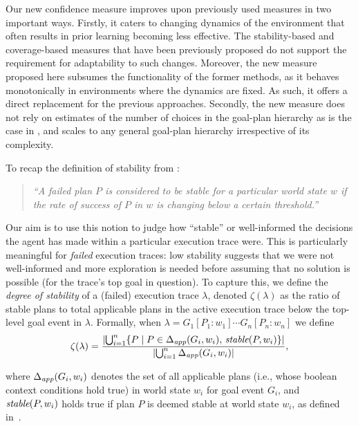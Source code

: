 Our new confidence measure improves upon previously used measures in two important ways. 
%
Firstly, it caters to changing dynamics of the environment that often results in prior learning becoming less effective. The stability-based \cite{airiau09:enhancing} and coverage-based \cite{singh10:extending,singh10:learning} measures that have been previously proposed do not support the requirement for adaptability to such changes. Moreover, the new measure proposed here subsumes the functionality of the former methods, as it behaves monotonically in environments where the dynamics are fixed. As such, it offers a direct replacement for the previous approaches. 
%
Secondly, the new measure does not rely on estimates of the number of choices in the goal-plan hierarchy as is the case in \cite{singh10:extending,singh10:learning}, and scales to any general goal-plan hierarchy irrespective of its complexity.


To recap the definition of stability from \cite{singh10:learning}:

\begin{quote}
\emph{``A failed plan $P$ is considered to be stable for a particular world state $w$ if the rate of success of $P$ in $w$ is changing below a certain threshold.''}
\end{quote} 

\newcommand{\ds}{\zeta}
\newcommand{\app}{\mathname{app}}
\newcommand{\stable}{\mathname{stable}}

Our aim is to use this notion to judge how ``stable'' or well-informed the decisions the agent has made within a particular execution trace were. This is particularly meaningful for \emph{failed} execution traces: low stability suggests that we were not well-informed and more exploration is needed before assuming that no solution is possible (for the trace's top goal in question).
To capture this, we define the \emph{degree of stability} of a (failed) execution trace $\lambda$, denoted $\ds(\lambda)$ as the ratio of stable plans to total applicable plans in the active execution trace below the top-level goal event in $\lambda$. Formally, when $\lambda= G_1[P_1:w_1] \cdots G_n[P_n:w_n]$ we define 
\[
\ds(\lambda) = 
	\frac{ 
			\card{ \bigcup_{i=1}^n \set{P \mid P \in \Delta_{\app}(G_i,w_i),\, \stable(P,w_i)} } 
		}
		{
			\card{	\bigcup_{i=1}^n \Delta_{\app}(G_i,w_i) } 
		},
\]

\noindent
where  $\Delta_{\app}(G_i,w_i)$ denotes the set of all applicable plans (i.e., whose boolean context conditions hold true) in world state $w_i$ for goal event $G_i$, and $\stable(P,w_i)$ holds true if plan $P$ is deemed stable at world state $w_i$, as defined in~\cite{singh10:learning}.

